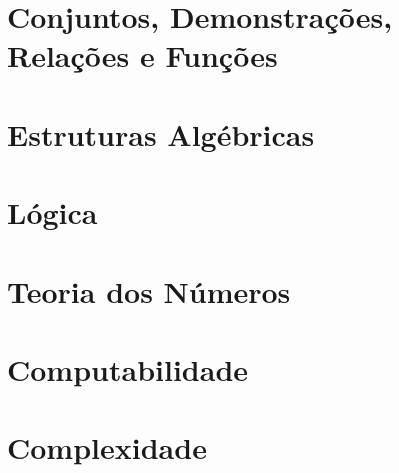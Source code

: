 \documentclass[11pt,fleqn]{book}
\begin{document}




\part{Conjuntos, Demonstrações, Relações e Funções}




\part{Estruturas Algébricas}

\part{Lógica}






\part{Teoria dos Números}
\part{Computabilidade}
\part{Complexidade}



\end{document}
